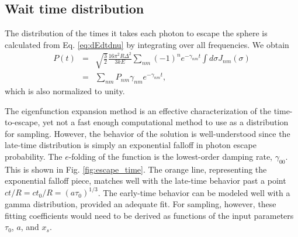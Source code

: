 \documentclass{aastex63}
\newcommand{\be}{\begin{eqnarray}}
\newcommand{\ee}{\end{eqnarray}}
\begin{document}
\subsection{Wait time distribution}

The distribution of the times it takes each photon to escape the sphere is calculated from Eq. \ref{eq:dEdtdnu} by integrating over all frequencies. We obtain
\be
P(t)  & = & \sqrt{\frac{3}{2}} \frac{16\pi^2 R \Delta^2 }{3kE}     \sum_{nm} (-1)^n  e^{-\gamma_{nm}t} \int d\sigma J_{nm}(\sigma) 
\nonumber \\ & = &  \sum_{nm} P_{nm} \gamma_{nm} e^{-\gamma_{nm}t},
\label{eq:waittime}
\ee
which is also normalized to unity.

The eigenfunction expansion method is an effective characterization of the time-to-escape, yet not a fast enough computational method to use as a distribution for sampling. However, the behavior of the solution is well-understood since the late-time distribution is simply an exponential falloff in photon escape probability. The $e$-folding of the function is the lowest-order damping rate, $\gamma_{00}$. This is shown in Fig. \ref{fig:escape_time}. The orange line, representing the exponential falloff piece, matches well with the late-time behavior past a point $ct/R = ct_{0}/R = (a\tau_0)^{1/3}$. The early-time behavior can be modeled well with a gamma distribution, provided an adequate fit. For sampling, however, these fitting coefficients would need to be derived as functions of the input parameters $\tau_0$, $a$, and $x_s$. 
\end{document}
